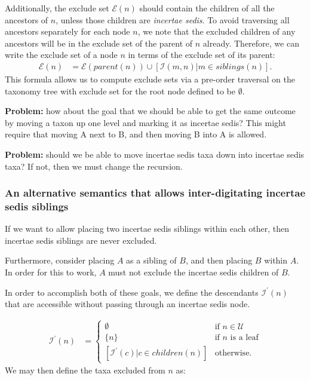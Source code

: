 \documentclass[english]{article}
\begin{document}
Additionally, the exclude set $\mathcal{E}(n)$ should contain the
children of all the ancestors of $n$, unless those children are
\emph{incertae sedis}. To avoid traversing all ancestors separately
for each node $n$, we note that the excluded children of any ancestors
will be in the exclude set of the parent of $n$ already. Therefore, we
can write the exclude set of a node $n$ in terms of the exclude set of
its parent:
\begin{align}
    \mathcal{E}(n) & = \mathcal{E}(parent(n))\cup\left[\mathcal{I}(m,n)\big|m\in
           siblings(n)\right].\label{eq:exclude-set-formula-1}
\end{align}
This
formula allows us to compute exclude sets via a pre-order traversal on
the taxonomy tree with exclude set for the root node defined to be
$\emptyset$.

\textbf{Problem:} how about the goal that we should be able to get the
same outcome by moving a taxon up one level and marking it as incertae
sedis? This might require that moving A next to B, and then moving B
into A is allowed.

\textbf{Problem:} should we be able to move incertae sedis taxa down
into incertae sedis taxa? If not, then we must change the recursion.

\subsubsection{An alternative semantics that allows inter-digitating
incertae sedis siblings}

If we want to allow placing two incertae sedis siblings within each
other, then incertae sedis siblings are never excluded.

Furthermore, consider placing $A$ as a sibling of $B$, and then
placing $B$ within $A$. In order for this to work, $A$ must not
exclude the incertae sedis children of $B$.

In order to accomplish both of these goals, we define the descendants
$\mathcal{I}^{\prime}(n)$ that are accessible without passing through
an incertae sedis node.

\begin{align*}
    \mathcal{I^{\prime}}(n) & =
    \begin{cases}
        \emptyset & \text{if }n\in\mathcal{U}\\
        \{n\} & \text{if }n\text{ is a leaf}\\
        [\mathcal{I}^{\prime}(c)|c\in children(n)] & \text{otherwise.}
\end{cases}
\end{align*} We may then define the taxa excluded from $n$
as:
\end{document}
